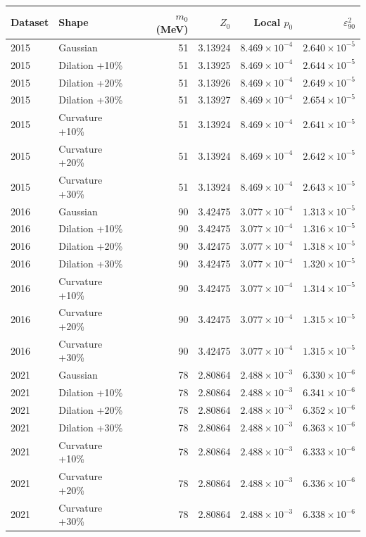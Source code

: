 \begin{tabular}{llrrrr}
\toprule
Dataset & Shape & $m_0$ (MeV) & $Z_0$ & Local $p_0$ & $\varepsilon^2_{90}$ \\
\midrule
2015 & Gaussian & 51 & 3.13924 & $8.469\times10^{-4}$ & $2.640\times10^{-5}$ \\
2015 & Dilation +10\% & 51 & 3.13925 & $8.469\times10^{-4}$ & $2.644\times10^{-5}$ \\
2015 & Dilation +20\% & 51 & 3.13926 & $8.469\times10^{-4}$ & $2.649\times10^{-5}$ \\
2015 & Dilation +30\% & 51 & 3.13927 & $8.469\times10^{-4}$ & $2.654\times10^{-5}$ \\
2015 & Curvature +10\% & 51 & 3.13924 & $8.469\times10^{-4}$ & $2.641\times10^{-5}$ \\
2015 & Curvature +20\% & 51 & 3.13924 & $8.469\times10^{-4}$ & $2.642\times10^{-5}$ \\
2015 & Curvature +30\% & 51 & 3.13924 & $8.469\times10^{-4}$ & $2.643\times10^{-5}$ \\
2016 & Gaussian & 90 & 3.42475 & $3.077\times10^{-4}$ & $1.313\times10^{-5}$ \\
2016 & Dilation +10\% & 90 & 3.42475 & $3.077\times10^{-4}$ & $1.316\times10^{-5}$ \\
2016 & Dilation +20\% & 90 & 3.42475 & $3.077\times10^{-4}$ & $1.318\times10^{-5}$ \\
2016 & Dilation +30\% & 90 & 3.42475 & $3.077\times10^{-4}$ & $1.320\times10^{-5}$ \\
2016 & Curvature +10\% & 90 & 3.42475 & $3.077\times10^{-4}$ & $1.314\times10^{-5}$ \\
2016 & Curvature +20\% & 90 & 3.42475 & $3.077\times10^{-4}$ & $1.315\times10^{-5}$ \\
2016 & Curvature +30\% & 90 & 3.42475 & $3.077\times10^{-4}$ & $1.315\times10^{-5}$ \\
2021 & Gaussian & 78 & 2.80864 & $2.488\times10^{-3}$ & $6.330\times10^{-6}$ \\
2021 & Dilation +10\% & 78 & 2.80864 & $2.488\times10^{-3}$ & $6.341\times10^{-6}$ \\
2021 & Dilation +20\% & 78 & 2.80864 & $2.488\times10^{-3}$ & $6.352\times10^{-6}$ \\
2021 & Dilation +30\% & 78 & 2.80864 & $2.488\times10^{-3}$ & $6.363\times10^{-6}$ \\
2021 & Curvature +10\% & 78 & 2.80864 & $2.488\times10^{-3}$ & $6.333\times10^{-6}$ \\
2021 & Curvature +20\% & 78 & 2.80864 & $2.488\times10^{-3}$ & $6.336\times10^{-6}$ \\
2021 & Curvature +30\% & 78 & 2.80864 & $2.488\times10^{-3}$ & $6.338\times10^{-6}$ \\
\bottomrule
\end{tabular}
